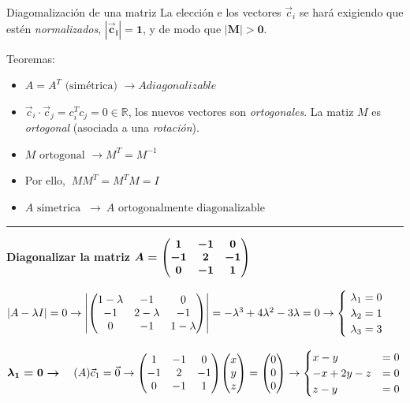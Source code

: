 \begin{myexampleblock}{Diagomalización de una matriz}
	\vspace{2mm}\textcolor{gris}{La elección e los vectores $\vec c_i$ se hará exigiendo que estén \emph{normalizados}, $\boldsymbol{|\vec c_i|=1}$, y de modo que $\boldsymbol{|M|>0}$.}
	
	\vspace{3mm}Teoremas:
	\begin{itemize}
	\item $A=A^T \text{ (simétrica) } \to A diagonalizable$
	\item $\vec c_i \cdot \vec c_j = c_i^T c_j = 0\in \mathbb R$, los nuevos vectores 	son \emph{ortogonales}. La matiz $M$ es \emph{ortogonal} (asociada a una \emph{rotación}).
	\item $ M \text{ ortogonal } \to M^T=M^{-1}$
	\item Por ello, $\ MM^T=M^TM=I$
	\item $A \text{ simetrica } \ \longrightarrow \ A \text{ ortogonalmente diagonalizable}$
	\end{itemize}
	
	
\begin{center}\rule{200pt}{0.1pt}\end{center}
		
\vspace{7mm}  \textbf{Diagonalizar la matriz} $ \boldsymbol{ A=\mqty(1&-1&0\\-1&2&-1\\0&-1&1)}$ 
		
\vspace{2mm}  $ |A-\lambda I|=0 \to \left| \mqty(1-\lambda&-1&0\\-1&2-\lambda&-1\\0&-1&1-\lambda) \right| = -\lambda^3+4\lambda^2-3\lambda=0 \to \begin{cases}
 \ \lambda_1=0 \\ \ \lambda_2=1 \\ \ \lambda_3=3	
 \end{cases}$		
		
\vspace{2mm} $\boldsymbol{\lambda_1=0 \to } \quad (A)\vec c_1=\vec 0 \to \mqty(1&-1&0\\-1&2&-1\\0&-1&1)\mqty(x\\y\\z)=\mqty(0\\0\\0) \to \begin{cases}
 	x-y&=0\\-x+2y-z&=0\\z-y&=0
 \end{cases}$
 

\end{myexampleblock}

